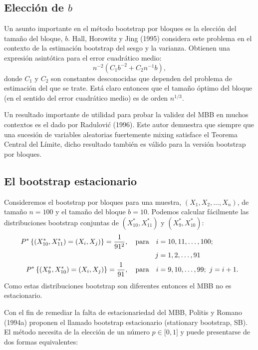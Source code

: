 \documentclass[
]{book}
\theoremstyle{definition}
\theoremstyle{definition}
\theoremstyle{definition}
\theoremstyle{remark}
\begin{document}
\hypertarget{elecciuxf3n-de-b}{%
\subsection{\texorpdfstring{Elección de \(b\)}{Elección de b}}\label{elecciuxf3n-de-b}}

Un asunto importante en el método bootstrap por bloques es la elección
del tamaño del bloque, \(b\). Hall, Horowitz y Jing (1995) considera este
problema en el contexto de la estimación bootstrap del sesgo y la
varianza. Obtienen una expresión asintótica para el error cuadrático
medio:
\[n^{-2}(C_1b^{-2}+C_2n^{-1}b),\]
donde \(C_1\) y \(C_2\) son
constantes desconocidas que dependen del problema de estimación del que
se trate. Está claro entonces que el tamaño óptimo del bloque (en el
sentido del error cuadrático medio) es de orden \(n^{1/3}\).

Un resultado importante de utilidad para probar la validez del MBB en
muchos contextos es el dado por Radulović (1996). Este autor demuestra
que siempre que una sucesión de variables aleatorias fuertemente mixing
satisface el Teorema Central del Límite, dicho resultado también es
válido para la versión bootstrap por bloques.

\hypertarget{el-bootstrap-estacionario}{%
\subsection{El bootstrap estacionario}\label{el-bootstrap-estacionario}}

Consideremos el bootstrap por bloques para una muestra,
\((X_1,X_2,\ldots ,X_n)\), de tamaño \(n=100\) y el tamaño del bloque \(b=10\). Podemos
calcular fácilmente las distribuciones bootstrap conjuntas de
\((X_{10}^{\ast},X_{11}^{\ast})\) y \((X_{9}^{\ast},X_{10}^{\ast})\):
\[\begin{aligned}
P^{\ast}\left\{ (X_{10}^{\ast},X_{11}^{\ast})=(X_i,X_j)\right\} =
\frac{1}{91^2},\quad \hbox{para}\quad i &= 10,11,\ldots ,100; \\
j &= 1,2,\ldots ,91 \\
P^{\ast}\left\{ (X_{9}^{\ast},X_{10}^{\ast})=(X_i,X_j)\right\} =\frac{
1}{91},\quad \hbox{para}\quad i &= 9,10,\ldots ,99;\,\,j=i+1.\end{aligned}\]Como
estas distribuciones bootstrap son diferentes entonces el MBB no es
estacionario.

Con el fin de remediar la falta de estacionariedad del MBB, Politis y
Romano (1994a) proponen el llamado bootstrap estacionario (stationary
bootstrap, SB). El método necesita de la elección de un número \(p\in \lbrack 0,1]\) y puede presentarse de dos formas equivalentes:
\end{document}
